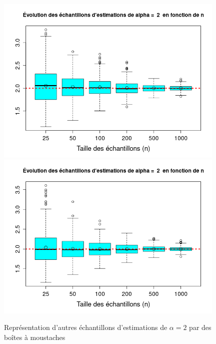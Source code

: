 \documentclass{article}
\begin{document}
\begin{figure}[!h]
\begin{center}
\includegraphics[width=11cm]{plot_box_1}
\includegraphics[width=11cm]{plot_box_2}
\caption{Représentation d'autres échantillons d'estimations de $\alpha=2$ par des boîtes à moustaches}
\end{center}
\end{figure}

\clearpage
\end{document}
